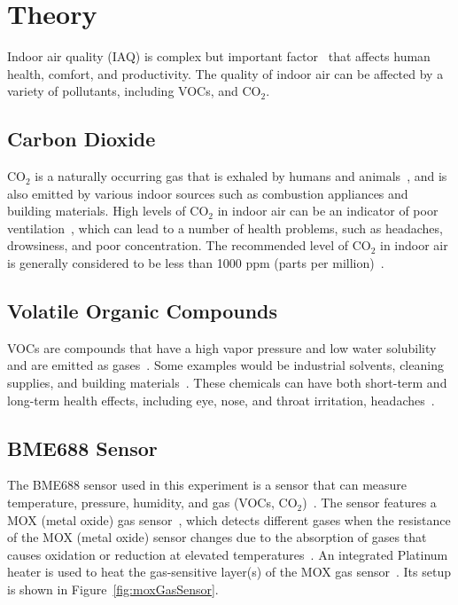 \documentclass[DIV=14]{scrartcl}
\begin{document}
    \section{Theory}\label{sec:theory}
    Indoor air quality (IAQ) is complex but important factor~\cite{labManual} that affects human health, comfort, and productivity.
    The quality of indoor air can be affected by a variety of pollutants, including VOCs, and $\mathrm{CO_2}$.

    \subsection*{Carbon Dioxide}\label{subsec:carbon-dioxide}
    $\mathrm{CO_2}$ is a naturally occurring gas that is exhaled by humans and animals~\cite{labManual}, and is also emitted by various indoor
    sources such as combustion appliances and building materials.
    High levels of $\mathrm{CO_2}$ in indoor air can be an indicator of poor ventilation~\cite{labManual}, which can lead to a number of health
    problems, such as headaches, drowsiness, and poor concentration.
    The recommended level of $\mathrm{CO_2}$ in indoor air is generally considered to be less than 1000 ppm (parts per million)~\cite{Prill}.

    \subsection*{Volatile Organic Compounds}\label{subsec:volatile-organic-compounds}
    VOCs are compounds that have a high vapor pressure and low water solubility~\cite{EPA} and are emitted as gases~\cite{EPA}.
    Some examples would be industrial solvents, cleaning supplies, and building materials~\cite{EPA}.
    These chemicals can have both short-term and long-term health effects, including eye, nose, and throat irritation,
    headaches~\cite{EPA2}.

    \subsection*{BME688 Sensor}\label{subsec:bme688-sensor}
    The BME688 sensor used in this experiment is a sensor that can measure temperature, pressure,
    humidity, and gas (VOCs, $\mathrm{CO_2}$)~\cite{BME688}.
    The sensor features a MOX (metal oxide) gas sensor~\cite{labManual}, which
    detects different gases when the resistance of the MOX (metal oxide) sensor changes due to the absorption of gases
    that causes oxidation or reduction at elevated temperatures~\cite{labManual}.
    An integrated Platinum heater is used to heat the gas-sensitive layer(s) of the MOX gas sensor~\cite{UST}.
    Its setup is shown in Figure~\ref{fig:moxGasSensor}.
\end{document}
